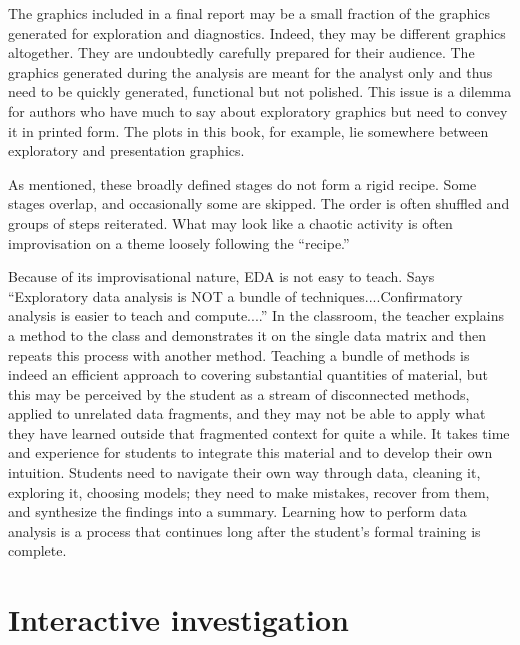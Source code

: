 The graphics included in a final report may be a small fraction of the
graphics generated for exploration and diagnostics.  Indeed, they may
be different graphics altogether. They are undoubtedly carefully
prepared for their audience. The graphics generated during the
analysis are meant for the analyst only and thus need to be quickly
generated, functional but not polished. This issue is a dilemma for
authors who have much to say about exploratory graphics but need to
convey it in printed form.  The plots in this book, for example, lie
somewhere between exploratory and presentation graphics.


\vspace{2em}

As mentioned, these broadly defined stages do not form a
rigid recipe.  Some stages overlap, and occasionally some are
skipped.  The order is often shuffled and groups of steps
reiterated.  What may look like a chaotic activity is often
improvisation on a theme loosely following the ``recipe.''

Because of its improvisational nature, EDA is not easy to teach. Says
 ``Exploratory data analysis is NOT a bundle of
techniques....Confirmatory analysis is easier to teach and
compute....'' In the classroom, the teacher explains a method to the
class and demonstrates it on the single data matrix and then repeats
this process with another method.  Teaching a bundle of methods is
indeed an efficient approach to covering substantial quantities of
material, but this may be perceived by the student as a stream of
disconnected methods, applied to unrelated data fragments, and they
may not be able to apply what they have learned outside that
fragmented context for quite a while.  It takes time and experience
for students to integrate this material and to develop their own
intuition.  Students need to navigate their own way through data,
cleaning it, exploring it, choosing models; they need to make
mistakes, recover from them, and synthesize the findings into a
summary.  Learning how to perform data analysis is a process that
continues long after the student's formal training is complete.




\section{Interactive investigation}

